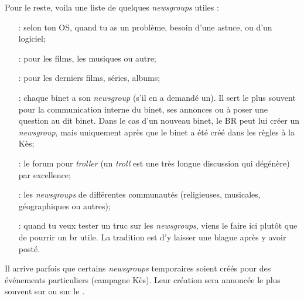 Pour le reste, voila une liste de quelques \emph{newsgroups} utiles :
\begin{itemize}

\item[\ngname{br.informatique.windows/linux/mac} :] selon ton OS, quand tu as un problème, besoin d'une astuce, ou d'un logiciel;

\item[\ngname{br.informatique.media.request.*} :] pour les films, les musiques ou autre;

\item[\ngname{br.informatique.media.nouveautes} :] pour les derniers films, séries, albums;

\item[\ngname{br.binet.ton\_binet} :] chaque binet a son \emph{newsgroup} (s'il en a demandé un). Il sert le plus souvent pour la communication interne du binet, ses annonces ou à poser une question au dit binet. Dans le cas d'un nouveau binet, le BR peut lui créer un \emph{newsgroup}, mais uniquement après que le binet a été créé dans les règles à la Kès;

\item[\ngname{br.binet.polemix} :] le forum pour \emph{troller} (un \emph{troll} est une très longue discussion qui dégénère) par excellence;
                          
\item[\ngname{br.communauté.*} :] les \emph{newsgroups} de différentes communautés (religieuses, musicales, géographiques ou autres);

\item[\ngname{br.test} :] quand tu veux tester un truc sur les \emph{newsgroups}, viens le faire ici plutôt que de pourrir un br utile. La tradition est d'y laisser une blague après y avoir posté.

\end{itemize}


Il arrive parfois que certains \emph{newsgroups} temporaires soient créés pour des événements particuliers (campagne Kès). Leur création sera annoncée
le plus souvent sur \fkz ou sur le .

